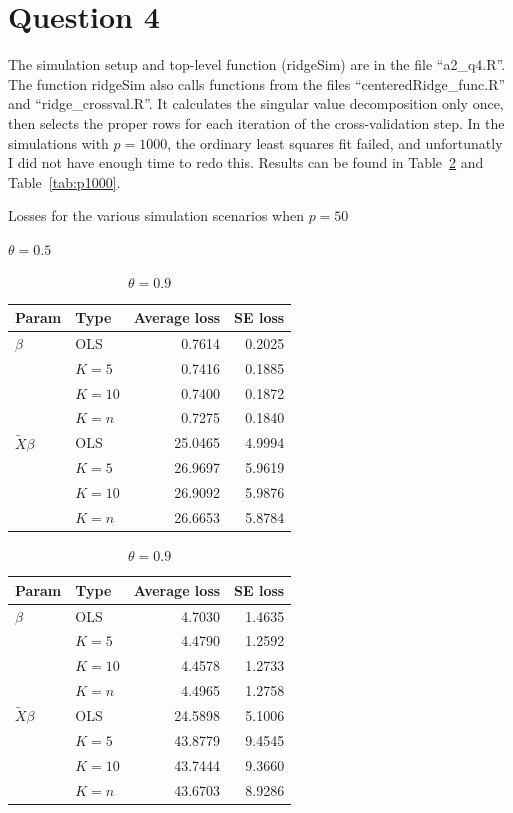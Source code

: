 \documentclass{article}\usepackage[]{graphicx}\usepackage[]{color}
\begin{document}
\section*{Question 4}
The simulation setup and top-level function (ridgeSim) are in the file ``a2\_q4.R''.  The function ridgeSim also calls functions from the files ``centeredRidge\_func.R'' and ``ridge\_crossval.R''.  It calculates the singular value decomposition only once, then selects the proper rows for each iteration of the cross-validation step.  In the simulations with $p=1000$, the ordinary least squares fit failed, and unfortunatly I did not have enough time to redo this.  Results can be found in Table~\ref{tab:p50} and Table~\ref{tab:p1000}.


\begin{table}[!htb]
    \caption{Losses for the various simulation scenarios when $p=50$}
    \label{tab:p50}
    \begin{subtable}{.5\linewidth}
      \caption{$\theta=0.5$}
      \centering
      \begin{tabular}{|llrr|}
       \hline
     Param & Type & Average loss & SE loss \\ 
      \hline
  $\beta$ & OLS & 0.7614 & 0.2025 \\ 
  & $K=5$ & 0.7416 & 0.1885 \\ 
  & $K=10$ & 0.7400 & 0.1872 \\ 
  & $K=n$ & 0.7275 & 0.1840 \\ 
  \hline
  $\tilde{X}\beta$ & OLS & 25.0465 & 4.9994 \\ 
  & $K=5$ & 26.9697 & 5.9619 \\ 
  & $K=10$ & 26.9092 & 5.9876 \\ 
  & $K=n$ & 26.6653 & 5.8784 \\ 
    \hline
  \end{tabular}
  \end{subtable}%
  \begin{subtable}{.5\linewidth}
      \centering
        \caption{$\theta=0.9$}
        \begin{tabular}{|llrr|}
       \hline
     Param & Type & Average loss & SE loss \\ 
      \hline
  $\beta$ & OLS & 4.7030 & 1.4635 \\ 
  & $K=5$ & 4.4790 & 1.2592 \\ 
  & $K=10$ & 4.4578 & 1.2733 \\ 
  & $K=n$ & 4.4965 & 1.2758 \\ 
  \hline
  $\tilde{X}\beta$ & OLS & 24.5898 & 5.1006 \\ 
  & $K=5$ & 43.8779 & 9.4545 \\ 
  & $K=10$ & 43.7444 & 9.3660 \\ 
  & $K=n$ & 43.6703 & 8.9286 \\ 
    \hline
  \end{tabular}
    \end{subtable} 
\end{table}
\end{document}
